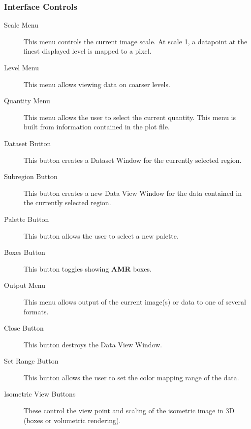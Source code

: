 \subsubsection{Interface Controls}

\begin{description}
\item[Scale Menu]  This menu controls the current image scale.  At
scale 1, a datapoint at the finest displayed level is mapped to a pixel.

\item[Level Menu] This menu allows viewing data on coarser levels.

\item[Quantity Menu]  This menu allows the user to select the current
quantity.  This menu is built from information contained in the plot
file.

\item[Dataset Button]  This button creates a Dataset Window for the
currently selected region.

\item[Subregion Button]  This button creates a new Data View Window for the
data contained in the currently selected region.

\item[Palette Button]  This button allows the user to select a new palette.

\item[Boxes Button]  This button toggles showing {\bf AMR} boxes.

\item[Output Menu]  This menu allows output of the current image(s) or
data to one of several formats.

\item[Close Button]  This button destroys the Data View Window.

\item[Set Range Button]  This button allows the user to set the color
mapping range of the data.

\item [Isometric View Buttons]  These control the view point and scaling
of the isometric image in 3D (boxes or volumetric rendering).


\end{description}
